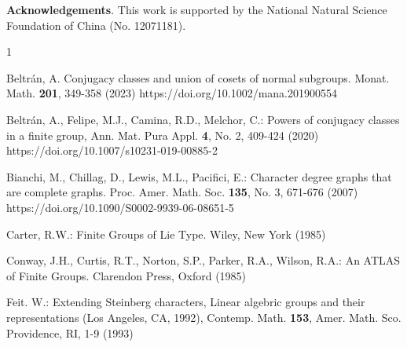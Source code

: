 \documentclass[12pt,leqno,a4paper]{amsart}
\numberwithin{equation}{section}
\begin{document}
\bigskip
\noindent
{\bf Acknowledgements}.  This work is supported by the National Natural Science Foundation of China (No. 12071181).










\begin{thebibliography}{1}








Beltr\'an, A.
\newblock  Conjugacy classes and union of cosets of normal subgroups.
\newblock Monat. Math. {\bf 201},   349-358  (2023) https://doi.org/10.1002/mana.201900554

Beltr\'an, A., Felipe, M.J., Camina, R.D., Melchor, C.:
\newblock Powers of conjugacy classes in a  finite group,
 \newblock Ann. Mat. Pura Appl. {\bf 4},  No. 2, 409-424 (2020)
https://doi.org/10.1007/s10231-019-00885-2


Bianchi, M., Chillag, D., Lewis, M.L., Pacifici, E.:
\newblock Character degree graphs that are complete graphs.
\newblock Proc. Amer. Math. Soc. {\bf 135}, No. 3, 671-676  (2007) https://doi.org/10.1090/S0002-9939-06-08651-5


Carter, R.W.:
Finite Groups of Lie Type. Wiley, New York (1985)

Conway, J.H., Curtis, R.T., Norton, S.P., Parker, R.A.,  Wilson, R.A.:
 An ATLAS of Finite Groups. Clarendon Press,
Oxford (1985)



Feit. W.:
Extending Steinberg characters, Linear algebric groups and their representations (Los Angeles, CA, 1992),
 Contemp. Math. {\bf 153}, Amer. Math. Sco. Providence, RI, 1-9  (1993)


\end{thebibliography}
\end{document}
